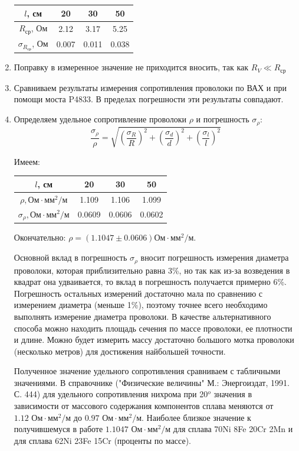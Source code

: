 \documentclass[a4paper, 10pt]{article}%
\begin{document}
\begin{enumerate}
\begin{tabular}{|c|c|c|c|}
\hline
$l$, см & 20 & 30 & 50 \\
\hline
$R_\text{ср}$, Ом & 2.12 & 3.17 & 5.25 \\
\hline
$\sigma_{R_\text{ср}}$, Ом & 0.007 & 0.011 & 0.038\\
\hline
\end{tabular}
\item Поправку в измеренное значение не приходится вносить, так как $R_V \ll R_\text{ср}$
\item Сравниваем результаты измерения сопротивления проволоки по ВАХ и при помощи моста P4833. В пределах погрешности эти результаты совпадают.
\item Определяем удельное сопротивление проволоки $\rho$ и погрешность $\sigma_\rho$: \\
\[\dfrac{\sigma_\rho}{\rho} = \sqrt{\left(\dfrac{\sigma_R}{R}\right)^2+\left(\dfrac{\sigma_d}{d}\right)^2+\left(\dfrac{\sigma_l}{l}\right)^2}\]

Имеем:

\begin{tabular}{|c|c|c|c|}
\hline
$l$, см & 20 & 30 & 50 \\
\hline
$\rho, \text{Ом}\cdot\text{мм}^2/\text{м}$ & 1.109 & 1.106 & 1.099 \\
\hline
$\sigma_\rho, \text{Ом}\cdot\text{мм}^2/\text{м}$ & 0.0609 & 0.0606 & 0.0602 \\
\hline
\end{tabular}

Окончательно: $\rho = \left(1.1047 \pm 0.0606\right) \text{Ом}\cdot\text{мм}^2/\text{м}$.

Основной вклад в погрешность $\sigma_\rho$ вносит погрешность измерения диаметра проволоки, которая приблизительно равна 3\%, но так как из-за возведения в квадрат она удваивается, то вклад в погрешность получается примерно 6\%. Погрешность остальных измерений достаточно мала по сравнению с измерением диаметра (меньше 1\%), поэтому точнее всего необходимо выполнять измерение диаметра проволоки. В качестве альтернативного способа можно находить площадь сечения по массе проволоки, ее плотности и длине. Можно будет измерить массу достаточно большого мотка проволоки (несколько метров) для достижения найбольшей точности.

Полученное значение удельного сопротивления сравниваем с табличными значениями. В справочнике ("Физические величины" М.: Энергоиздат, 1991. С. 444) для удельного сопротивления нихрома при 20$^o$ значения в зависимости от массового содержания компонентов сплава меняются от $1.12 \text{ Ом}\cdot\text{мм}^2/\text{м}$ до $0.97 \text{ Ом}\cdot\text{мм}^2/\text{м}$. Наиболее близкое значение к получившемуся в работе $1.1047 \text{ Ом}\cdot\text{мм}^2/\text{м}$ для сплава 70Ni 8Fe 20Cr 2Mn и для сплава 62Ni 23Fe 15Cr (проценты по массе).
\end{enumerate}
\end{document}
